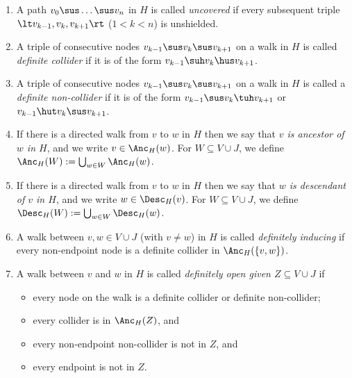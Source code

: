 \begin{Def}
\begin{enumerate}
      with the bidirected edge $w \huh v$.
    \item A path $v_0 \sus \dots \sus v_n$ in $H$ is called \emph{uncovered} if every subsequent triple $\lt v_{k-1}, v_k, v_{k+1} \rt$ ($1 < k < n$) is unshielded.
    \item A triple of consecutive nodes $v_{k-1} \sus v_k \sus v_{k+1}$ on a walk in $H$ is called \emph{definite collider}
      if it is of the form $v_{k-1} \suh v_k \hus v_{k+1}$.
    \item A triple of consecutive nodes $v_{k-1} \sus v_k \sus v_{k+1}$ on a walk in $H$ is called a \emph{definite non-collider}
      if it is of the form $v_{k-1} \sus v_k \tuh v_{k+1}$ or $v_{k-1} \hut v_k \sus v_{k+1}$.
    \item If there is a directed walk from $v$ to $w$ in $H$ then we say that \emph{$v$ is ancestor of $w$ in $H$}, 
      and we write $v \in \Anc_H(w)$. For $W \subseteq V \cup J$, we define $\Anc_H(W) := \bigcup_{w\in W} \Anc_H(w)$.
    \item If there is a directed walk from $v$ to $w$ in $H$ then we say that \emph{$w$ is descendant of $v$ in $H$}, 
      and we write $w \in \Desc_H(v)$. For $W \subseteq V \cup J$, we define $\Desc_H(W) := \bigcup_{w\in W} \Desc_H(w)$.
    \item A walk between $v,w \in V \cup J$ (with $v \ne w$) in $H$ is called \emph{definitely inducing} if every non-endpoint node is a definite collider in $\Anc_H(\{v,w\})$.
    \item A walk between $v$ and $w$ in $H$ is called \emph{definitely open given $Z \subseteq V \cup J$} if
      \begin{itemize}
        \item every node on the walk is a definite collider or definite non-collider;
        \item every collider is in $\Anc_H(Z)$, and
        \item every non-endpoint non-collider is not in $Z$, and
        \item every endpoint is not in $Z$.
      \end{itemize}
  \end{enumerate}
\end{Def}

